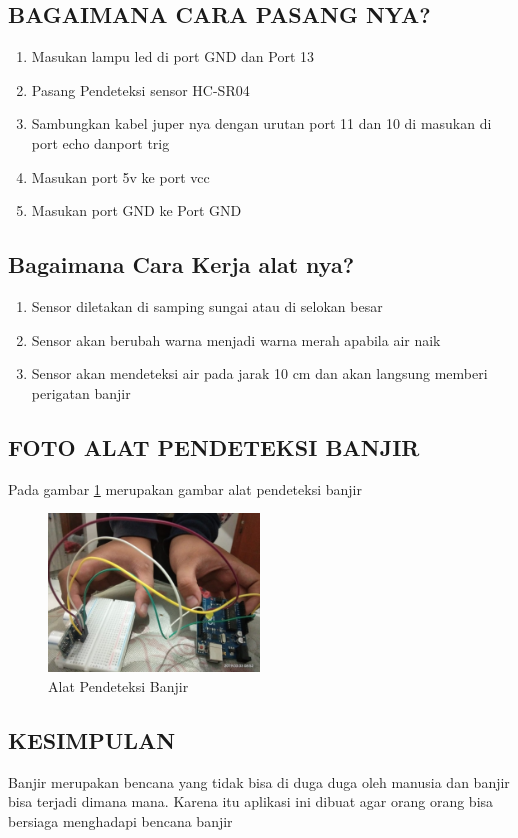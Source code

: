 \subsection{BAGAIMANA CARA PASANG NYA?}
\begin{enumerate}
\item Masukan lampu led di port GND dan Port 13
\item Pasang Pendeteksi sensor HC-SR04
\item Sambungkan kabel juper nya dengan urutan port 11 dan 10 di masukan di port echo danport trig
\item Masukan port 5v ke port vcc
\item Masukan port GND ke Port GND
\end{enumerate}

\subsection{Bagaimana Cara Kerja alat nya?}
\begin{enumerate}
\item Sensor diletakan di samping sungai atau di selokan besar
\item Sensor akan berubah warna menjadi warna merah apabila air naik 
\item Sensor akan mendeteksi air pada jarak 10 cm dan akan langsung memberi perigatan banjir 
\end{enumerate}

\subsection{FOTO ALAT PENDETEKSI BANJIR}
Pada gambar \ref{labelgambar7} merupakan gambar alat pendeteksi banjir
\begin{figure}[htbp]
	\centering
	\includegraphics[width=0.5\textwidth]{figures/ALAT_PENDETEKSI_BANJIR/foto_alat_pendeteksi_banjir}
	\caption{Alat Pendeteksi Banjir}
	\label{labelgambar7}
	\end{figure}

\subsection{KESIMPULAN}
Banjir merupakan bencana yang tidak bisa di duga duga oleh manusia dan banjir bisa terjadi dimana mana. Karena itu aplikasi ini dibuat agar orang orang bisa bersiaga menghadapi bencana banjir
 